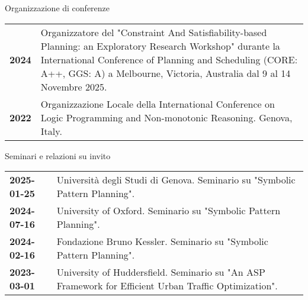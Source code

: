 \documentclass{resume} %
\begin{document}
  \begin{rSection}{Organizzazione di conferenze}
	\begin{tabularx}{0.95\textwidth} {lp{14cm}}
 \textbf{2024} & Organizzatore del "Constraint And Satisfiability-based Planning: an Exploratory Research Workshop" durante la International Conference of Planning and Scheduling (CORE: A++, GGS: A) a Melbourne, Victoria, Australia dal 9 al 14 Novembre 2025. \\
  \textbf{2022} & Organizzazione Locale della International Conference on Logic Programming and Non-monotonic Reasoning. Genova, Italy.
  \end{tabularx}
 \end{rSection}


 \begin{rSection}{Seminari e relazioni su invito}
 	\begin{tabularx}{0.95\textwidth} {lp{14cm}}
 \textbf{2025-01-25} & Università degli Studi di Genova. Seminario su "Symbolic Pattern Planning".\\
 \textbf{2024-07-16} & University of Oxford. Seminario su "Symbolic Pattern Planning".\\
 \textbf{2024-02-16} & Fondazione Bruno Kessler. Seminario su "Symbolic Pattern Planning".\\
 \textbf{2023-03-01} & University of Huddersfield. Seminario su "An ASP Framework for Efficient Urban Traffic Optimization".\\
 \end{tabularx}

\end{rSection}
\end{document}

